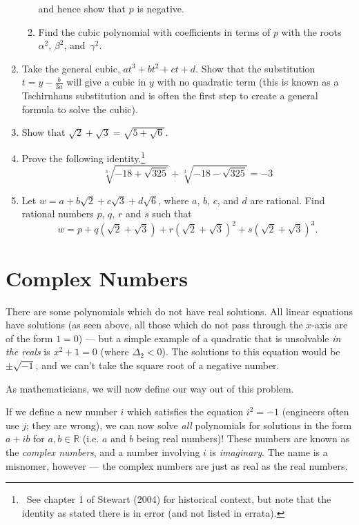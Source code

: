 \documentclass[a4paper,10pt,titlepage]{article}
\theoremstyle{definition}
\newcommand{\harder}{\refstepcounter{enumi}\item[$^{\star\star}$\theenumi.]}
\begin{document}
\begin{enumerate}
\begin{enumerate}
                and hence show that $ p $ is negative.
          \item Find the cubic polynomial with coefficients in terms of $ p $ with the
                roots $ \alpha^2 $, $ \beta^2 $, and~$ \gamma^2 $.
        \end{enumerate}
  \item Take the general cubic, $ at^3 + bt^2 + ct + d $. Show that the substitution $ t = y - \frac{b}{3a} $
        will give a cubic in $ y $ with no quadratic term (this is known as a Tschirnhaus substitution and is
        often the first step to create a general formula to solve the cubic).
  \item Show that $ \sqrt{2} + \sqrt{3} = \sqrt{5 + \sqrt{6}} $.
  \harder Prove the following identity.\footnote{~See chapter 1 of Stewart (2004) for historical context,
        but note that the identity as stated there is in error (and not listed in errata).}
        \begin{displaymath}
          \sqrt[3]{-18 + \sqrt{325}} + \sqrt[3]{-18 - \sqrt{325}} = -3
        \end{displaymath}
  \item Let $ w = a + b\sqrt{2} + c\sqrt{3} + d\sqrt{6} $, where $ a $, $ b $, $ c $, and $ d $ are rational.
        Find rational numbers $ p $, $ q $, $ r $ and $ s $ such that
        \begin{displaymath}
          w = p + q(\sqrt{2}  + \sqrt{3}) + r(\sqrt{2} + \sqrt{3})^2 + s(\sqrt{2} + \sqrt{3})^3.
        \end{displaymath}
\end{enumerate}

\section{Complex Numbers}
There are some polynomials which do not have real solutions. All linear equations have
solutions (as seen above, all those which do not pass through the $x$-axis are of
the form $ 1 = 0 $) --- but a simple example of a quadratic that is unsolvable \emph{in
the reals} is $ x^2 + 1 = 0 $ (where $ \Delta_2 < 0 $). The solutions to this
equation would be $ \pm\sqrt{-1} $, and we can't take the square root of a negative number.

As mathematicians, we will now define our way out of this problem.

If we define a new number $ i $ which satisfies the equation $ i^2 = -1 $ (engineers often use $ j $; they are wrong), we can
now solve \emph{all} polynomials for solutions in the form $ a + ib$ for $ a, b \in \mathbb{R} $
(i.e. $ a $ and $ b $ being real numbers)! These numbers are known as the \emph{complex numbers}, and a number
involving $ i $ is \emph{imaginary}. The name is a misnomer, however --- the complex numbers are just as real
as the real numbers.
\end{document}
